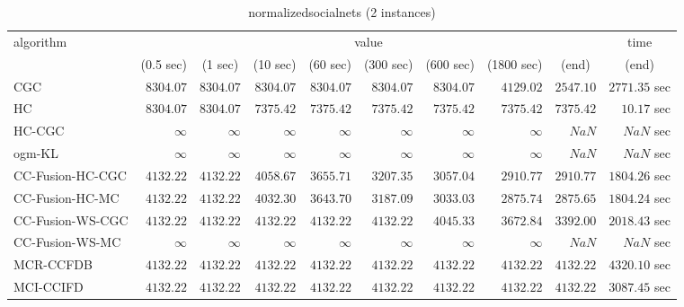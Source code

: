\begin{table}[H]
\scriptsize
\centering
\caption{normalizedsocialnets (2 instances)}
\label{tab:anytimetable-normalizedsocialnets}
\begin{tabular}{lrrrrrrrrr}
\toprule
           algorithm &                                   \multicolumn{8}{c}{value} & \multicolumn{1}{c}{time}   \\  
\cmidrule(lr){2-9}\cmidrule(lr){10-10}   
                     & \multicolumn{1}{c}{(0.5 sec)} & \multicolumn{1}{c}{(1 sec)} & \multicolumn{1}{c}{(10 sec)} & \multicolumn{1}{c}{(60 sec)} & \multicolumn{1}{c}{(300 sec)} & \multicolumn{1}{c}{(600 sec)} & \multicolumn{1}{c}{(1800 sec)} & \multicolumn{1}{c}{(end)} & \multicolumn{1}{c}{(end)}   \\ \midrule 
                 CGC & $      8304.07$ & $      8304.07$ & $      8304.07$ & $      8304.07$ & $      8304.07$ & $      8304.07$ & $      4129.02$ & $      2547.10$ & $      2771.35$ sec   \\ 
                  HC & $      8304.07$ & $      8304.07$ & $      7375.42$ & $      7375.42$ & $      7375.42$ & $      7375.42$ & $      7375.42$ & $      7375.42$ & $        10.17$ sec   \\ 
              HC-CGC & $\infty$ & $\infty$ & $\infty$ & $\infty$ & $\infty$ & $\infty$ & $\infty$ & $          NaN$ & $          NaN$ sec   \\ 
              ogm-KL & $\infty$ & $\infty$ & $\infty$ & $\infty$ & $\infty$ & $\infty$ & $\infty$ & $          NaN$ & $          NaN$ sec   \\ 
    CC-Fusion-HC-CGC & $      4132.22$ & $      4132.22$ & $      4058.67$ & $      3655.71$ & $      3207.35$ & $      3057.04$ & $      2910.77$ & $      2910.77$ & $      1804.26$ sec   \\ 
     CC-Fusion-HC-MC & $      4132.22$ & $      4132.22$ & $      4032.30$ & $      3643.70$ & $      3187.09$ & $      3033.03$ & $      2875.74$ & $      2875.65$ & $      1804.24$ sec   \\ 
    CC-Fusion-WS-CGC & $      4132.22$ & $      4132.22$ & $      4132.22$ & $      4132.22$ & $      4132.22$ & $      4045.33$ & $      3672.84$ & $      3392.00$ & $      2018.43$ sec   \\ 
     CC-Fusion-WS-MC & $\infty$ & $\infty$ & $\infty$ & $\infty$ & $\infty$ & $\infty$ & $\infty$ & $          NaN$ & $          NaN$ sec   \\ 
\cmidrule{1-1} 
           MCR-CCFDB & $      4132.22$ & $      4132.22$ & $      4132.22$ & $      4132.22$ & $      4132.22$ & $      4132.22$ & $      4132.22$ & $      4132.22$ & $      4320.10$ sec   \\ 
\cmidrule{1-1} 
           MCI-CCIFD & $      4132.22$ & $      4132.22$ & $      4132.22$ & $      4132.22$ & $      4132.22$ & $      4132.22$ & $      4132.22$ & $      4132.22$ & $      3087.45$ sec   \\ 
\bottomrule
\end{tabular}
\end{table}